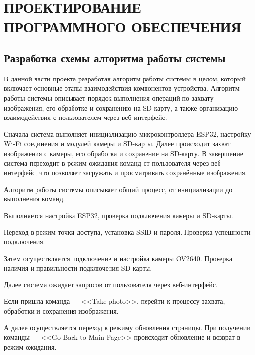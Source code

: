 \chapter[Проектирование программного обеспечения]
{ПРОЕКТИРОВАНИЕ ПРОГРАММНОГО ОБЕСПЕЧЕНИЯ}

\section{Разработка схемы алгоритма работы системы}\par
\hspace*{12.5 mm}В данной части проекта разработан алгоритм 
работы системы в целом, который включает основные этапы 
взаимодействия компонентов устройства. Алгоритм работы системы 
описывает порядок выполнения операций по захвату изображения, 
его обработке и сохранению на SD-карту, а также организацию 
взаимодействия с пользователем через веб-интерфейс.

    Сначала система выполняет инициализацию микроконтроллера 
ESP32, настройку Wi-Fi соединения и модулей камеры и SD-карты. 
Далее происходит захват изображения с камеры, его обработка и 
сохранение на SD-карту. В завершение система переходит в режим 
ожидания команд от пользователя через веб-интерфейс, что 
позволяет загружать и просматривать сохранённые изображения.

Алгоритм работы системы описывает общий процесс, от инициализации до выполнения команд.

Выполняется настройка ESP32, проверка подключения камеры и SD-карты.

Переход в режим точки доступа, установка SSID и пароля.
Проверка успешности подключения.

Затем осуществляется подключение и настройка камеры OV2640.
Проверка наличия и правильности подключения SD-карты.

Далее система ожидает запросов от пользователя через веб-интерфейс.

Если пришла команда — <<Take photo>>, перейти к процессу захвата, обработки и сохранения изображения.

А далее осуществляется переход к режиму обновления страницы. 
При получении команды — <<Go Back to Main Page>> происходит обновление
и возврат в режим ожидания.

